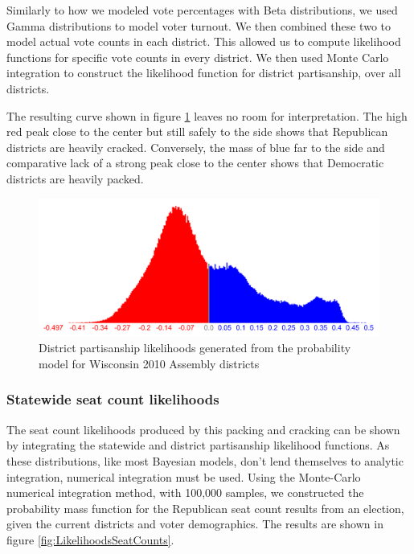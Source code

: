 \documentclass[preprint,12pt]{article}
\begin{document}
Similarly to how we modeled vote percentages with Beta distributions, we used Gamma distributions to model voter turnout.  We then combined these two to model actual vote counts in each district.  This allowed us to compute likelihood functions for specific vote counts in every district.  We then used Monte Carlo integration to construct the likelihood function for district partisanship, over all districts.
 
The resulting curve shown in figure \ref{fig:LikelihoodsDistrictPartisanship} leaves no room for interpretation.  The high red peak close to the center but still safely to the side shows that Republican districts are heavily cracked.  Conversely, the mass of blue far to the side and comparative lack of a strong peak close to the center shows that Democratic districts are heavily packed.
 
\begin{figure}[htb!]
    \begin{center}
        \includegraphics[scale=0.25]{../Figures/WI2010/district_partisanship_cropped.png}
        \caption{District partisanship likelihoods generated from the probability model for Wisconsin 2010 Assembly districts}\label{fig:LikelihoodsDistrictPartisanship}
    \end{center}
\end{figure}

\subsubsection{Statewide seat count likelihoods}
 
The seat count likelihoods produced by this packing and cracking can be shown by integrating the statewide and district partisanship likelihood functions.  As these distributions, like most Bayesian models, don't lend themselves to analytic integration, numerical integration must be used. Using the Monte-Carlo numerical integration method, with 100,000 samples, we constructed the probability mass function for the Republican seat count results from an election, given the current districts and voter demographics.  The results are shown in figure \ref{fig:LikelihoodsSeatCounts}.
 
\end{document}
